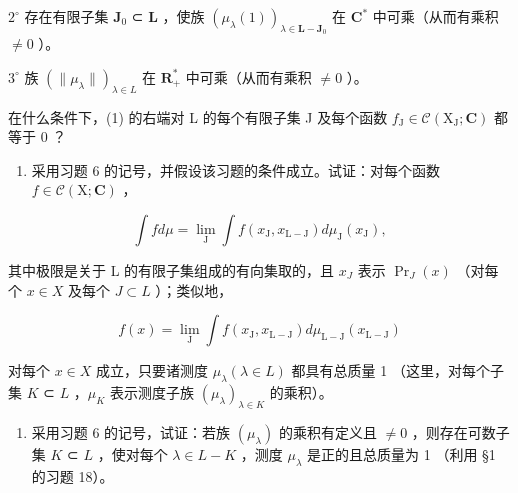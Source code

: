 \(2^{\circ}\) 存在有限子集 \(\mathbf{J}_0\) ⊂ \(\mathbf{L}\) ，使族 \((\mu_{\lambda}(1))_{\lambda \in \mathbf{L} - \mathbf{J}_0}\) 在 \(\mathbf{C}^*\) 中可乘（从而有乘积 \(\neq 0\) ）。

\(3^{\circ}\) 族 \((\| \mu_{\lambda}\|)_{\lambda \in L}\) 在 \(\mathbf{R}_{+}^{*}\) 中可乘（从而有乘积 \(\neq 0\) ）。

在什么条件下，(1) 的右端对 L 的每个有限子集 J 及每个函数 \(f_{\mathrm{J}} \in \mathcal{C}(\mathrm{X}_{\mathrm{J}}; \mathbf{C})\) 都等于 0 ？

\begin{enumerate}
\def\labelenumi{\arabic{enumi})}
\setcounter{enumi}{6}
\tightlist
\item
  采用习题 6 的记号，并假设该习题的条件成立。试证：对每个函数 \(f \in \mathcal{C}(\mathrm{X};\mathbf{C})\) ，
\end{enumerate}

\[
\int f d \mu = \lim _ {\mathrm{J}} \int f (x _ {\mathrm{J}}, x _ {\mathrm{L} - \mathrm{J}}) d \mu_ {\mathrm{J}} (x _ {\mathrm{J}}),
\]

其中极限是关于 L 的有限子集组成的有向集取的，且 \(x_{J}\) 表示 \(\Pr_{J}(x)\) （对每个 \(x \in X\) 及每个 \(J \subset L\) ）；类似地，

\[
f (x) = \lim _ {\mathrm{J}} \int f (x _ {\mathrm{J}}, x _ {\mathrm{L} - \mathrm{J}}) d \mu_ {\mathrm{L} - \mathrm{J}} (x _ {\mathrm{L} - \mathrm{J}})
\]

对每个 \(x \in X\) 成立，只要诸测度 \(\mu_{\lambda} (\lambda \in L)\) 都具有总质量 1 （这里，对每个子集 \(K\) ⊂ \(L\) ，\(\mu_{K}\) 表示测度子族 \((\mu_{\lambda})_{\lambda \in K}\) 的乘积）。

\begin{enumerate}
\def\labelenumi{\arabic{enumi})}
\setcounter{enumi}{7}
\tightlist
\item
  采用习题 6 的记号，试证：若族 \((\mu_{\lambda})\) 的乘积有定义且 \(\neq 0\) ，则存在可数子集 \(K\) ⊂ \(L\) ，使对每个 \(\lambda \in L - K\) ，测度 \(\mu_{\lambda}\) 是正的且总质量为 1 （利用 §1 的习题 18）。
\end{enumerate}

